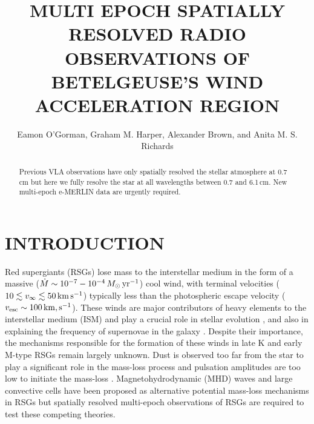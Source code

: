 \documentclass[iop]{emulateapj}
\begin{document}
\title{MULTI EPOCH SPATIALLY RESOLVED RADIO OBSERVATIONS OF BETELGEUSE'S WIND ACCELERATION REGION}


\author{Eamon O'Gorman, Graham M. Harper, Alexander Brown, and Anita M. S. Richards}



\begin{abstract}

Previous VLA observations have only spatially resolved the stellar atmosphere at 0.7\,cm but here we fully resolve the star at all wavelengths between 0.7 and 6.1\,cm. New multi-epoch e-MERLIN data are urgently required.

\end{abstract}


\section{INTRODUCTION}
Red supergiants (RSGs) lose mass to the interstellar medium in the form of a massive ($\dot{M} \sim 10^{-7} - 10^{-4}\,M_{\odot}\,\rm{yr}^{-1}$) cool wind, with terminal velocities ($10\lesssim v_{\infty}\lesssim 50\,{\rm{km}}\,\rm{s}^{-1}$) typically less than the photospheric escape velocity  ($v_{\rm{esc}} \sim 100\,\rm{km},\rm{s}^{-1}$). These winds are major contributors of heavy elements to the interstellar medium (ISM) and play a crucial role in stellar evolution \citep{chiosi_1986}, and also in explaining the frequency of supernovae in the galaxy \citep[e.g.,][]{van_loon_2010}. Despite their importance, the mechanisms responsible for the formation of these winds in late K and early M-type RSGs remain largely unknown. Dust is observed too far from the star to play a significant role in the mass-loss process \citep{danchi_1994} and pulsation amplitudes are too low to initiate the mass-loss \citep{smith_1989}. Magnetohydrodynamic (MHD) waves \citep[e.g.,][]{thirumalai_2012} and large convective cells \citep[e.g.,][]{josselin_2007} have been proposed as alternative potential mass-loss mechanisms in RSGs but spatially resolved multi-epoch observations of RSGs are required to test these competing theories.
\end{document}
